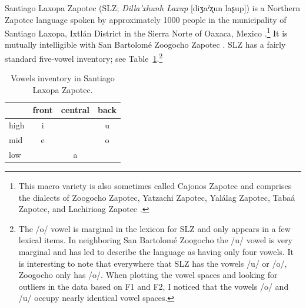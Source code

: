 \documentclass[12pt, letterpaper]{article}
\providecommand{\lsptoprule}{\midrule\toprule}
\providecommand{\lspbottomrule}{\bottomrule\midrule}
\begin{document}
Santiago Laxopa Zapotec (SLZ; \textit{Dilla'xhunh Laxup} [diʒaˀʐun laʂup]) is a Northern Zapotec language spoken by approximately 1000 people in the municipality of Santiago Laxopa, Ixtlán District in the Sierra Norte of Oaxaca, Mexico \citep{adlerAcousticsPhonationTypes2016,adlerDerivationVerbInitiality2018,foleyForbiddenCliticClusters2018,foleyExtendingPersonCaseConstraint2020}.\footnote{This macro variety is also sometimes called Cajonos Zapotec and comprises the dialects of Zoogocho Zapotec, Yatzachi Zapotec, Yalálag Zapotec, Tabaá Zapotec, and Lachirioag Zapotec \citep{smith-starkAlgunasIsoglosasZapotecas2003}.} It is mutually intelligible with San Bartolomé Zoogocho Zapotec \citep{longDiccionarioZapotecoSan2005,sonnenscheinDescriptiveGrammarSan2005}. SLZ has a fairly standard five-vowel inventory; see Table~\ref{tab:SLZvowels}.\footnote{The /o/ vowel is marginal in the lexicon for SLZ and only appears in a few lexical items. In neighboring San Bartolomé Zoogocho the /u/ vowel is very marginal and has led \citet{sonnenscheinDescriptiveGrammarSan2005} to describe the language as having only four vowels. It is interesting to note that everywhere that SLZ has the vowels /u/ or /o/, Zoogocho only has /o/. When plotting the vowel spaces and looking for outliers in the data based on F1 and F2, I noticed that the vowels /o/ and /u/ occupy nearly identical vowel spaces.}

\begin{table}[!h]
\centering
\caption{Vowels inventory in Santiago Laxopa Zapotec.}
\label{tab:SLZvowels}
    \begin{tabular}{lccc}
    \lsptoprule
	&  front& central  & back \\
    \midrule
    high   	&  i  &     &   u \\
    mid    	&  e  &   	& 	o \\
    low   	&     &  a 	&	  \\
    \lspbottomrule
    \end{tabular}
\end{table}
		
\end{document}
